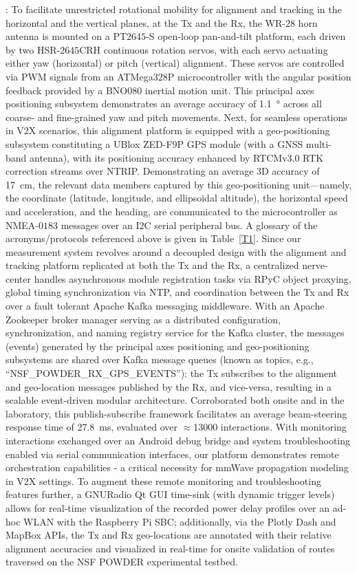 \documentclass[10pt, twocolumn]{IEEEtran}
\begin{document}
: To facilitate unrestricted rotational mobility for alignment and tracking in the horizontal and the vertical planes, at the Tx and the Rx, the WR-$28$ horn antenna is mounted on a PT$2645$-S open-loop pan-and-tilt platform, each driven by two HSR-$2645$CRH continuous rotation servos, with each servo actuating either yaw (horizontal) or pitch (vertical) alignment. These servos are controlled via PWM signals from an ATMega$328$P microcontroller with the angular position feedback provided by a BNO$080$ inertial motion unit. This principal axes positioning subsystem demonstrates an average accuracy of \SI{1.1}{\degree} across all coarse- and fine-grained yaw and pitch movements. Next, for seamless operations in V$2$X scenarios, this alignment platform is equipped with a geo-positioning subsystem constituting a UBlox ZED-F$9$P GPS module (with a GNSS multi-band antenna), with its positioning accuracy enhanced by RTCMv$3.0$ RTK correction streams over NTRIP. Demonstrating an average $3$D accuracy of \SI{17}{\centi\meter}, the relevant data members captured by this geo-positioning unit---namely, the coordinate (latitude, longitude, and ellipsoidal altitude), the horizontal speed and acceleration, and the heading, are communicated to the microcontroller as NMEA-$0183$ messages over an I$2$C serial peripheral bus. A glossary of the acronyms/protocols referenced above is given in Table~\ref{T1}. Since our measurement system revolves around a decoupled design with the alignment and tracking platform replicated at both the Tx and the Rx, a centralized nerve-center handles asynchronous module registration tasks via RPyC object proxying, global timing synchronization via NTP, and coordination between the Tx and Rx over a fault tolerant Apache Kafka messaging middleware. With an Apache Zookeeper broker manager serving as a distributed configuration, synchronization, and naming registry service for the Kafka cluster, the messages (events) generated by the principal axes positioning and geo-positioning subsystems are shared over Kafka message queues (known as topics, e.g., ``NSF\_POWDER\_RX\_GPS\_EVENTS''): the Tx subscribes to the alignment and geo-location messages published by the Rx, and vice-versa, resulting in a scalable event-driven modular architecture. Corroborated both onsite and in the laboratory, this publish-subscribe framework facilitates an average beam-steering response time of \SI{27.8}{\milli\second}, evaluated over ${\approx}$\SI{13000}{} interactions. With monitoring interactions exchanged over an Android debug bridge and system troubleshooting enabled via serial communication interfaces, our platform demonstrates remote orchestration capabilities - a critical necessity for mmWave propagation modeling in V$2$X settings. To augment these remote monitoring and troubleshooting features further, a GNURadio Qt GUI time-sink (with dynamic trigger levels) allows for real-time visualization of the recorded power delay profiles over an ad-hoc WLAN with the Raspberry Pi SBC; additionally, via the Plotly Dash and MapBox APIs, the Tx and Rx geo-locations are annotated with their relative alignment accuracies and visualized in real-time for onsite validation of routes traversed on the NSF POWDER experimental testbed.
\end{document}
